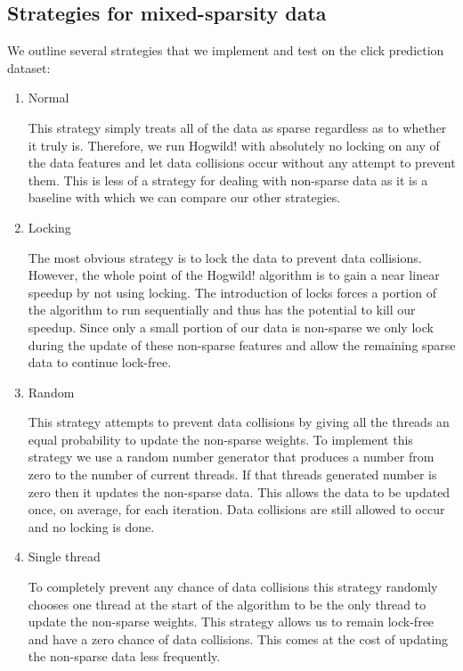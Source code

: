 \documentclass{article} %
\begin{document}
\subsection{Strategies for mixed-sparsity data}
We outline several strategies that we implement and test on the click prediction dataset:
\begin{enumerate}

\item Normal

This strategy simply treats all of the data as sparse regardless as to whether it truly is.  Therefore, we run Hogwild! with absolutely no locking on any of the data features and let data collisions occur without any attempt to prevent them. This is less of a strategy for dealing with non-sparse data as it is a baseline with which we can compare our other strategies. 

\item Locking

The most obvious strategy is to lock the data to prevent data collisions.  However, the whole point of the Hogwild! algorithm is to gain a near linear speedup by not using locking.  The introduction of locks forces a portion of the algorithm to run sequentially and thus has the potential to kill our speedup.  Since only a small portion of our data is non-sparse we only lock during the update of these non-sparse features and allow the remaining sparse data to continue lock-free. 

\item Random

This strategy attempts to prevent data collisions by giving all the threads an equal probability to update the non-sparse weights.  To implement this strategy we use a random number generator that produces a number from zero to the number of current threads. If that threads generated number is zero then it updates the non-sparse data.  This allows the data to be updated once, on average, for each iteration.  Data collisions are still allowed to occur and no locking is done. 

\item Single thread

To completely prevent any chance of data collisions this strategy randomly chooses one thread at the start of the algorithm to be the only thread to update the non-sparse weights. This strategy allows us to remain lock-free and have a zero chance of data collisions.  This comes at the cost of updating the non-sparse data less frequently.
 

\end{enumerate}
\end{document}
